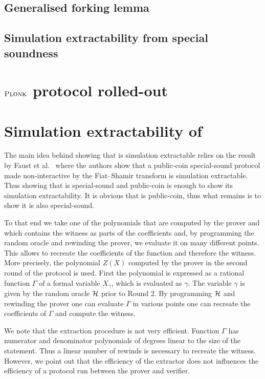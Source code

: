 \documentclass[runningheads]{llncs}
\theoremstyle{definition}
\begin{document}
\subsection{Generalised forking lemma}
\subsection{Simulation extractability from special soundness}
\section{$\textsc{Plonk}$ protocol rolled-out}
\section{Simulation extractability of \plonk}
The main idea behind showing that \plonk{} is simulation extractable relies on the result by Faust et al.~\cite{INDOCRYPT:FKMV12} where the authors show that a public-coin special-sound protocol made non-interactive by the Fiat--Shamir transform is simulation extractable.
Thus showing that \plonk{} is special-sound and public-coin is enough to show its simulation extractability. It is obvious that \plonk{} is public-coin, thus what remains is to show it is also special-sound.

To that end we take one of the polynomials that are computed by the prover and which contains the witness as parts of the coefficients and, by programming the random oracle and rewinding the prover, we evaluate it on many different points. This allows to recreate the coefficients of the function and therefore the witness.  
%
More precisely, the polynomial $Z(X)$ computed by the prover in the second round of the protocol is used. First the polynomial is expressed as a rational function $\Gamma$ of a formal variable $X_\gamma$, which is evaluated as $\gamma$. 
The variable $\gamma$ is given by the random oracle $\mathcal{H}$ prior to Round 2. 
By programming $\mathcal{H}$ and rewinding the prover one can evaluate $\Gamma$ in various points one can recreate the coefficients of $\Gamma$ and compute the witness. 

We note that the extraction procedure is not very efficient. Function $\Gamma$ has numerator and denominator polynomials of degrees linear to the size of the statement. Thus a linear number of rewinds is necessary to recreate the witness.
However, we point out that the efficiency of the extractor does not influences the efficiency of a protocol run between the prover and verifier.
\end{document}
